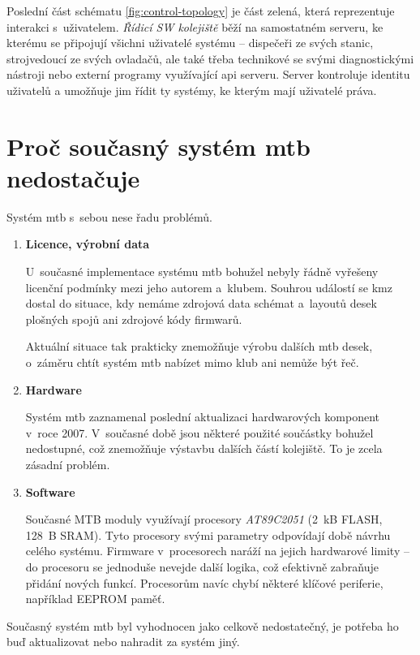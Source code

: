 Poslední část schématu \ref{fig:control-topology} je část zelená, která
reprezentuje interakci s~uživatelem. \textit{Řídicí SW kolejiště} běží na
samostatném serveru, ke kterému se připojují všichni uživatelé systému –
dispečeři ze svých stanic, strojvedoucí ze svých ovladačů, ale také třeba
technikové se svými diagnostickými nástroji nebo externí programy využívající
\gls{api} serveru. Server kontroluje identitu uživatelů a umožňuje jim řídit ty
systémy, ke kterým mají uživatelé práva.

\section{Proč současný systém \gls{mtb} nedostačuje} \label{sec:mtb_fail}

Systém \gls{mtb} s~sebou nese řadu problémů.

\begin{enumerate}
\item \textbf{Licence, výrobní data}

U~současné implementace systému \gls{mtb} bohužel nebyly řádně vyřešeny licenční
podmínky mezi jeho autorem a~klubem. Souhrou událostí se \gls{kmz} dostal do
situace, kdy nemáme zdrojová data schémat a~layoutů desek plošných spojů ani
zdrojové kódy firmwarů.

Aktuální situace tak prakticky znemožňuje výrobu dalších \gls{mtb} desek,
o~záměru chtít systém \gls{mtb} nabízet mimo klub ani nemůže být řeč.

\item \textbf{Hardware}

Systém \gls{mtb} zaznamenal poslední aktualizaci hardwarových komponent v~roce
2007. V~současné době jsou některé použité součástky bohužel nedostupné, což
znemožňuje výstavbu dalších částí kolejiště. To je zcela zásadní problém.

\item \textbf{Software}

Současné MTB moduly využívají procesory \textit{AT89C2051} (2~kB FLASH,
128~B SRAM). Tyto procesory svými parametry odpovídají době návrhu celého
systému. Firmware v~procesorech naráží na jejich hardwarové limity – do
procesoru se jednoduše nevejde další logika, což efektivně zabraňuje přidání
nových funkcí. Procesorům navíc chybí některé klíčové periferie, například
EEPROM paměť.

\end{enumerate}

Současný systém \gls{mtb} byl vyhodnocen jako celkově nedostatečný, je potřeba
ho buď aktualizovat nebo nahradit za systém jiný.

